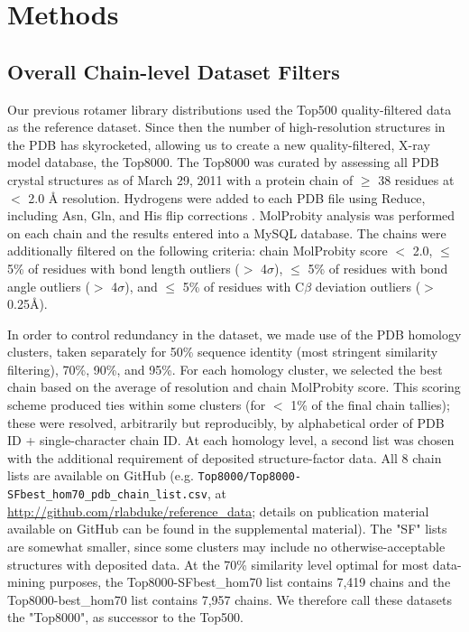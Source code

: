 \section{Methods}
\subsection{\textcolor{changecolor}{Overall} Chain-level Dataset Filters}
Our previous rotamer library distributions \cite{lovell2000penultimate} used the Top500 quality-filtered data \citep{Lovell:2003uq} as the reference dataset. Since then the number of high-resolution structures in the PDB has skyrocketed, allowing us to create a new quality-filtered, X-ray model database, the Top8000. The Top8000 was curated by assessing all PDB crystal structures as of March 29, 2011 with a protein chain of $\ge$ 38 residues at $<$ 2.0 \AA{} resolution. Hydrogens were added to each PDB file using Reduce, including Asn, Gln, and His flip corrections \citep{Word19991735}. MolProbity analysis was performed on each chain \citep{Chen:2010kx} and the results entered into a MySQL database. The chains were additionally filtered on the following criteria: chain MolProbity score $<$ 2.0, $\le$ 5\% of residues with bond length outliers ($>$ 4$\sigma$), $\le$ 5\% of residues with bond angle outliers ($>$ 4$\sigma$), and $\le$ 5\% of residues with C$\beta$ deviation outliers ($>$ 0.25\AA{}).

In order to control redundancy in the dataset, we made use of the PDB homology clusters, taken separately for 50\% sequence identity (most stringent similarity filtering), 70\%, 90\%, and 95\%. For each homology cluster, we selected the best chain based on the average of resolution and chain MolProbity score. This scoring scheme produced ties within some clusters (for $<$ 1\% of the final chain tallies); these were resolved, arbitrarily but reproducibly, by alphabetical order of PDB ID + single-character chain ID. At each homology level, a second list was chosen with the additional requirement of deposited structure-factor data. All 8 chain lists are available on GitHub \citep{Dabbish:2012} (e.g. \texttt{Top8000/Top8000-SFbest\_hom70\_pdb\_chain\_list.csv}, at \url{http://github.com/rlabduke/reference_data}\textcolor{changecolor}{; details on publication material available on GitHub can be found in the supplemental material}). The "SF" lists are somewhat smaller, since some clusters may include no otherwise-acceptable structures with deposited data. At the 70\% similarity level optimal for most data-mining purposes, the Top8000-SFbest\_hom70 list contains 7,419 chains and the Top8000-best\_hom70 list contains 7,957 chains. \textcolor{changecolor}{We therefore call these datasets the "Top8000", as successor to the Top500.}


